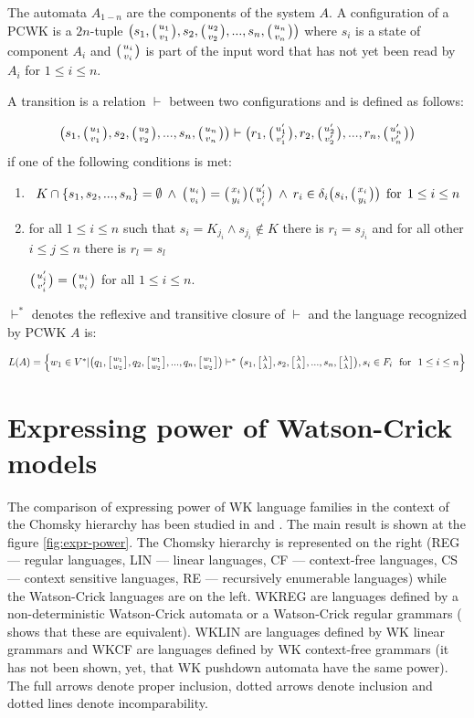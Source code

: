 The automata $A_{1-n}$ are the components of the system $A$. A configuration  of a PCWK is a $2n$-tuple $\big(s_1, \wkpair{u_1}{v_1}, s_2, \wkpair{u_2}{v_2}, ..., s_n, \wkpair{u_n}{v_n}\big)$
where $s_i$ is a state of component $A_i$ and $\wkpair{u_i}{v_i}$ is part of the input word that has not yet been read by $A_i$ for $1 \leq i \leq n$.

A transition is a relation $\vdash$ between two configurations and is defined as follows:

$$\big(s_1, \wkpair{u_1}{v_1}, s_2, \wkpair{u_2}{v_2}, ..., s_n, \wkpair{u_n}{v_n}\big) \vdash \big(r_1, \wkpair{u'_1}{v'_1}, r_2, \wkpair{u'_2}{v'_2}, ..., r_n, \wkpair{u'_n}{v'_n}\big)$$ if one of the following conditions is met:

\begin{enumerate}
  \item{$$K \cap \{s_1, s_2, ..., s_n\} = \emptyset \: \wedge \: \wkpair{u_i}{v_i} = \wkpair{x_i}{y_i}\wkpair{u'_i}{v'_i} \: \wedge \: r_i \in \delta_i\big(s_i, \wkpair{x_i}{y_i}\big)\:\: \textnormal{for} \:\: 1 \leq i \leq n$$}

  \item{for all $1 \leq i \leq n$ such that $s_i = K_{j_i} \wedge s_{j_i} \notin K$ there is $r_i = s_{j_i}$ and for all other $i \leq j \leq n$ there is $r_l = s_l$

  $\wkpair{u'_i}{v'_i} = \wkpair{u_i}{v_i}$ for all $1 \leq i \leq n$.}
\end{enumerate}

$\vdash^*$ denotes the reflexive and transitive closure of $\vdash$ and the language recognized by PCWK $A$ is:

$L(A) = \Big\{w_1 \in V^*| \big(q_1, \wkdomain{w_1}{w_2}, q_2, \wkdomain{w_1}{w_2}, ..., q_n, \wkdomain{w_1}{w_2}\big) \vdash^* \big(s_1, \wkdomain{\lambda}{\lambda}, s_2, \wkdomain{\lambda}{\lambda}, ..., s_n, \wkdomain{\lambda}{\lambda}\big), s_i \in F_i \:\:\: \textnormal{for} \:\:\: 1 \leq i \leq n\Big\}$

\section{Expressing power of Watson-Crick models} \label{section:exp_power}

The comparison of expressing power of WK language families in the context of the Chomsky hierarchy has been studied in \cite{WK_GRAMMARS_1} and \cite{WK_GRAMMARS_2}. The main result is shown at the figure \ref{fig:expr-power}. The Chomsky hierarchy is represented on the right (REG --- regular languages, LIN --- linear languages, CF --- context-free languages, CS --- context sensitive languages, RE --- recursively enumerable languages) while the Watson-Crick languages are on the left. WKREG are languages defined by a non-deterministic Watson-Crick automata or a Watson-Crick regular grammars (\cite{REG_GRAMMAR} shows that these are equivalent). WKLIN are languages defined by WK linear grammars and WKCF are languages defined by WK context-free grammars (it has not been shown, yet, that WK pushdown automata have the same power). The full arrows denote proper inclusion, dotted arrows denote inclusion and dotted lines denote incomparability.

